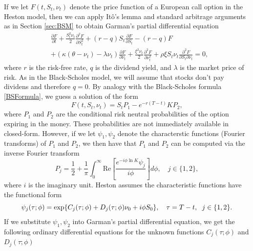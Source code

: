 If we let $F(t,S_{t},\nu_{t})$ denote the price function of a European call option in the Heston model, then we can apply Itô's lemma and standard arbitrage arguments as in Section \ref{sec:BSM} to obtain Garman's partial differential equation
\begin{align*}
    &\frac{\partial F}{\partial t} + \frac{S_{t}^{2}\nu_{t}}{2}\frac{\partial^{2}F}{\partial S_{t}^{2}} + (r-q)S_{t}\frac{\partial F}{\partial S_{t}} - (r-q)F\\
    &+ \left(\kappa(\theta - \nu_{t})-\lambda \nu_{t}\right)\frac{\partial F}{\partial \nu_{t}} + \frac{\xi^{2}\nu_{t}}{2}\frac{\partial^{2}F}{\partial \nu_{t}^{2}} + \rho\xi S_{t}\nu_{t}\frac{\partial^{2}F}{\partial S_{t}\partial \nu_{t}}=0,
\end{align*}
where $r$ is the risk-free rate, $q$ is the dividend yield, and $\lambda$ is the market price of risk. As in the Black-Scholes model, we will assume that stocks don't pay dividens and therefore $q=0$. By analogy with the Black-Scholes formula \ref{BSFormula}, we guess a solution of the form
\begin{equation}
    F(t,S_{t},\nu_{t})=S_{t}P_{1} - e^{-r(T-t)}KP_{2},
\end{equation}
where $P_{1}$ and $P_{2}$ are the conditional risk neutral probabilities of the option expiring in the money. These probabilities are not immediately available in closed-form.
However, if we let $\psi_{1},\psi_{2}$ denote the characterstic functions (Fourier transforms) of $P_{1}$ and $P_{2}$, we then have that $P_{1}$ and $P_{2}$ can be computed via the inverse Fourier transform
\begin{equation}
    P_{j}=\frac{1}{2}+\frac{1}{\pi}\int_{0}^{\infty}\textrm{Re}\left[\frac{e^{-i\phi \ln K}\psi_{j}}{i\phi}\right]d\phi, \quad j\in \{1,2\},
\end{equation}
where $i$ is the imaginary unit. Heston assumes the characteristic functions have the functional form
\begin{equation}
    \psi_{j}(\tau; \phi)=\exp\left\{C_{j}(\tau;\phi)+D_{j}(\tau;\phi)\nu_{0}+i\phi S_{0}\right\},\quad \tau=T-t, \hspace{6 pt}j\in\{1,2\}.
\end{equation}
If we substitute $\psi_{1},\psi_{2}$ into Garman's partial differential equation, we get the following ordinary differential equations for the unknown functions $C_{j}(\tau;\phi)$ and $D_{j}(\tau;\phi)$
